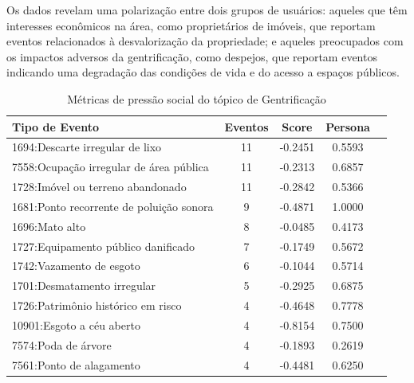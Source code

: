 Os dados revelam uma polarização entre dois grupos de usuários: aqueles que têm interesses econômicos na área, como proprietários de imóveis, que reportam eventos relacionados à desvalorização da propriedade; e aqueles preocupados com os impactos adversos da gentrificação, como despejos, que reportam eventos indicando uma degradação das condições de vida e do acesso a espaços públicos.

\begin{table}[htbp]
	\centering
	\caption{Métricas de pressão social do tópico de Gentrificação}
	\label{tab:eventos_populares_social_gentrification}
	\begin{tabular}{|l|c|c|c|c|}
		\hline
		\textbf{Tipo de Evento}                  & \textbf{Eventos} & \textbf{Score} & \textbf{Persona} \\
		\hline
		1694:Descarte irregular de lixo          & 11               & -0.2451        & 0.5593           \\
		\hline
		7558:Ocupação irregular de área pública  & 11               & -0.2313        & 0.6857           \\
		\hline
		1728:Imóvel ou terreno abandonado        & 11               & -0.2842        & 0.5366           \\
		\hline
		1681:Ponto recorrente de poluição sonora & 9                & -0.4871        & 1.0000           \\
		\hline
		1696:Mato alto                           & 8                & -0.0485        & 0.4173           \\
		\hline
		1727:Equipamento público danificado      & 7                & -0.1749        & 0.5672           \\
		\hline
		1742:Vazamento de esgoto                 & 6                & -0.1044        & 0.5714           \\
		\hline
		1701:Desmatamento irregular              & 5                & -0.2925        & 0.6875           \\
		\hline
		1726:Patrimônio histórico em risco       & 4                & -0.4648        & 0.7778           \\
		\hline
		10901:Esgoto a céu aberto                & 4                & -0.8154        & 0.7500           \\
		\hline
		7574:Poda de árvore                      & 4                & -0.1893        & 0.2619           \\
		\hline
		7561:Ponto de alagamento                 & 4                & -0.4481        & 0.6250           \\

\end{tabular}
\end{table}

